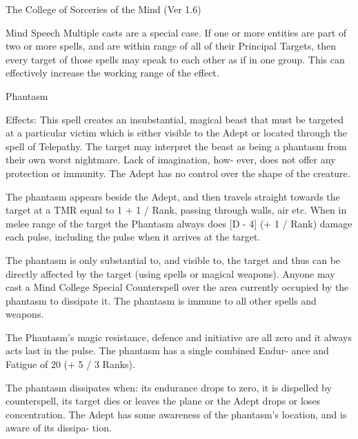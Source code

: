 \begin{Chapter}{The College of Sorceries of the Mind (Ver 1.6)}
\begin{spell}[S-5]{Mind Speech }
Multiple  casts  are  a  special  case.  If  one  or  more 
entities  are  part  of  two  or  more  spells,  and  are 
within  range  of  all  of  their  Principal  Targets,  then 
every target of those spells may speak to each other 
as if in one group. This can effectively increase the 
working range of the effect. 

\end{spell}

\begin{spell}[S-6]{Phantasm }

Effects: This spell creates an insubstantial, magical 
beast  that  must  be  targeted  at  a  particular  victim 
which  is  either  visible  to  the  Adept  or  located 
through  the  spell  of  Telepathy.  The  target  may 
interpret  the  beast  as  being  a  phantasm  from  their 
own  worst  nightmare.  Lack  of  imagination,  how-
ever,  does  not  offer  any  protection  or  immunity. 
The  Adept  has  no  control  over  the  shape  of  the 
creature. 

The  phantasm  appears  beside  the  Adept,  and  then 
travels  straight  towards  the  target  at  a  TMR  equal 
to  1  +  1  /  Rank,  passing  through  walls,  air  etc. 
When  in  melee  range  of  the  target  the  Phantasm 
always  does  [D  -  4]  (+  1  /  Rank)  damage  each 
pulse,  including  the  pulse  when  it  arrives  at  the 
target. 

The phantasm is only substantial to, and visible to, 
the  target  and  thus  can  be  directly  affected  by  the 
target  (using  spells  or  magical  weapons).  Anyone 
may cast a Mind College Special Counterspell over 
the  area  currently  occupied  by  the  phantasm  to 
dissipate  it.  The  phantasm  is  immune  to  all  other 
spells and weapons. 

The  Phantasm’s  magic  resistance,  defence  and 
initiative  are  all  zero  and  it  always  acts  last in the 
pulse. The phantasm has a single combined Endur-
ance and Fatigue of 20 (+ 5 / 3 Ranks). 

The phantasm dissipates when: its endurance drops 
to  zero,  it  is  dispelled  by  counterspell,  its  target 
dies or leaves the plane or the Adept drops or loses 
concentration.  The  Adept  has  some  awareness  of 
the phantasm’s location, and is aware of its dissipa-
tion. 

\end{spell}


\end{Chapter}
